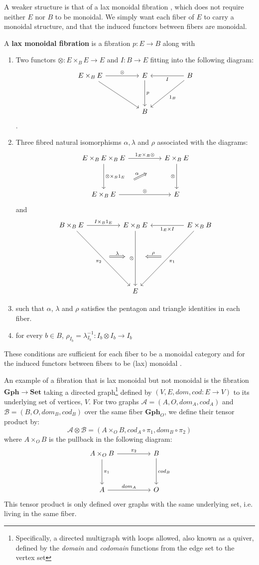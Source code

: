 A weaker structure is that of a lax monoidal fibration \cite{zawadowski}, which does not require neither $E$ nor $B$ to be monoidal. We simply want each fiber of $E$ to carry a monoidal structure, and that the induced functors between fibers are monoidal.
\begin{defn}\label{laxmonoidal}
A \textbf{lax monoidal fibration} is a fibration $p : E \to B$ along with
\begin{enumerate}
\item Two functors $\otimes : E \times_{B} E \to E$ and $I : B \to E$ fitting into the following diagram:
\[
\ti
E \times_{B} E \ar[r, "\otimes"] \ar[rd] & E \ar[d, "p"] & B \ar[l, "I"] \ar[ld, "1_B"] \\
& B &
\kz
\].
\item Three fibred natural isomorphisms $\alpha, \lambda$ and $\rho$ associated with the diagrams:
\[
\ti
E \times_B E \times_B E \ar[r, "1_E \times_B \otimes"] \ar[d, "\otimes \times_B 1_E"] & E \times_B E \ar[d, "\otimes", swap] \\
E \times_B E \ar[r, "\otimes"] \ar[ru, "\alpha", Rightarrow, shorten <=30pt,shorten >=30pt]  & E
\kz
\]
and
\[
\ti
B \times_B E \ar[r, "I \times_B 1_{E}"] \ar[rdd, "\pi_2",swap] & E \times_B E  \ar[dd, "\otimes",swap] & E \times_B B \ar[ldd, "\pi_1"] \ar[l, "1_E \times I"] \\
\ar[r, "\lambda", xshift=20 pt, Rightarrow, shorten <=30pt, shorten >=30pt] & {}& \ar[l, "\rho", Rightarrow, xshift=-20pt, shorten <=30pt, shorten >=30pt,swap] \\
  & E &  
\kz
\]
\item such that $\alpha$, $\lambda$ and $\rho$ satisfies the pentagon and triangle identities in each fiber.
\item for every $b \in B$, $\rho_{I_b} = \lambda^{-1}_{I_b} : I_b \otimes I_b \to I_b$
\end{enumerate}
\end{defn}
These conditions are sufficient for each fiber to be a monoidal category and for the induced functors between fibers to be (lax) monoidal \cite{zawadowski}.\\
\begin{expl}\label{graphs}
An example of a fibration that is lax monoidal but not monoidal is the fibration $\mathbf{Gph} \to \mathbf{Set}$ taking a directed graph\footnote{Specifically, a directed multigraph with loops allowed, also known as a quiver, defined by the \textit{domain} and \textit{codomain} functions from the edge set to the vertex set} defined by $(V, E, dom, cod : E \to V)$ to its underlying set of vertices, $V$. For two graphs $\mathcal{A}= (A, O, dom_A, cod_A)$ and $\mathcal{B} = (B, O, dom_B, cod_B)$ over the same fiber $\mathbf{Gph}_O$, we define their tensor product by:
\[
  \mathcal{A} \otimes \mathcal{B} = (A \times_O B, cod_A \circ \pi_1, dom_B \circ \pi_2)
\]
where $A \times_O B$ is the pullback in the following diagram:
\[
  \ti
  A \times_O B \ar[r, "\pi_2"] \ar[d, "\pi_1"] & B \ar[d, "cod_B"]\\
  A \ar[r, "dom_A"] & O
  \kz
\]
This tensor product is only defined over graphs with the same underlying set, i.e. living in the same fiber.
\end{expl}